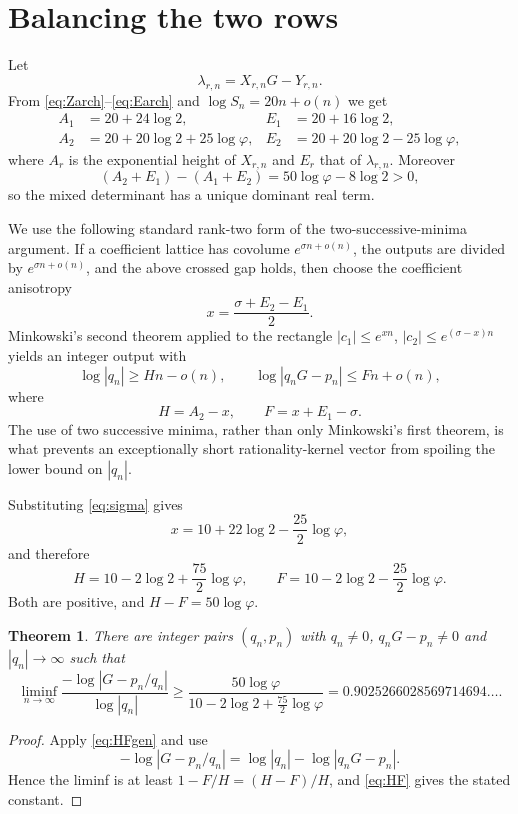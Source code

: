\documentclass[11pt]{article}
\newtheorem{theorem}{Theorem}
\newcommand{\phiG}{\varphi}
\begin{document}
\section{Balancing the two rows}

Let
\[
 \lambda_{r,n}=X_{r,n}G-Y_{r,n}.
\]
From \eqref{eq:Zarch}--\eqref{eq:Earch} and $\log S_n=20n+o(n)$ we get
\begin{align*}
 A_1&=20+24\log2,& E_1&=20+16\log2,\\
 A_2&=20+20\log2+25\log\phiG,
 &E_2&=20+20\log2-25\log\phiG,
\end{align*}
where $A_r$ is the exponential height of $X_{r,n}$ and $E_r$ that of
$\lambda_{r,n}$.  Moreover
\[
 (A_2+E_1)-(A_1+E_2)=50\log\phiG-8\log2>0,
\]
so the mixed determinant has a unique dominant real term.

We use the following standard rank-two form of the two-successive-minima
argument.  If a coefficient lattice has covolume $e^{\sigma n+o(n)}$, the
outputs are divided by $e^{\sigma n+o(n)}$, and the above crossed gap holds,
then choose the coefficient anisotropy
\[
 x=\frac{\sigma+E_2-E_1}{2}.
\]
Minkowski's second theorem applied to the rectangle
$|c_1|\le e^{xn}$, $|c_2|\le e^{(\sigma-x)n}$ yields an integer output with
\begin{equation}\label{eq:HFgen}
 \log|q_n|\ge Hn-o(n),
 \qquad
 \log|q_nG-p_n|\le Fn+o(n),
\end{equation}
where
\[
 H=A_2-x,
 \qquad
 F=x+E_1-\sigma.
\]
The use of two successive minima, rather than only Minkowski's first theorem,
is what prevents an exceptionally short rationality-kernel vector from
spoiling the lower bound on $|q_n|$.

Substituting \eqref{eq:sigma} gives
\[
 x=10+22\log2-\frac{25}{2}\log\phiG,
\]
and therefore
\begin{equation}\label{eq:HF}
 \boxed{H=10-2\log2+\frac{75}{2}\log\phiG},
 \qquad
 \boxed{F=10-2\log2-\frac{25}{2}\log\phiG}.
\end{equation}
Both are positive, and $H-F=50\log\phiG$.

\begin{theorem}\label{thm:main}
There are integer pairs $(q_n,p_n)$ with $q_n\ne0$, $q_nG-p_n\ne0$ and
$|q_n|\to\infty$ such that
\[
 \liminf_{n\to\infty}
 \frac{-\log|G-p_n/q_n|}{\log|q_n|}
 \ge
 \frac{50\log\phiG}
 {10-2\log2+\frac{75}{2}\log\phiG}
 =0.9025266028569714694\ldots .
\]
\end{theorem}

\begin{proof}
Apply \eqref{eq:HFgen} and use
\[
 -\log|G-p_n/q_n|
 =\log|q_n|-\log|q_nG-p_n|.
\]
Hence the liminf is at least $1-F/H=(H-F)/H$, and \eqref{eq:HF} gives the
stated constant.
\end{proof}
\end{document}
